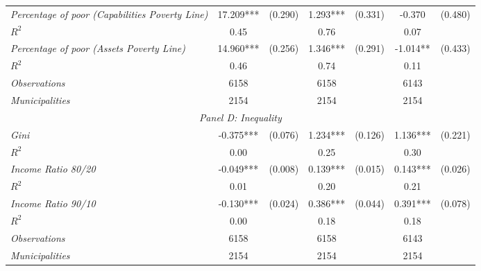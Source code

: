 \begin{tabular}{lcccccc}
\textit{Percentage of poor (Capabilities Poverty Line)}          &  17.209***    & (0.290)      &   1.293***        &  (0.331)      &     -0.370  &    (0.480)   \\
$R^{2}$			           	   &  0.45   & 	   &     0.76   	&		 &     0.07   &  \\

\textit{Percentage of poor (Assets Poverty Line)}          &  14.960***    & (0.256)      &   1.346***        &  (0.291)      &     -1.014**  &    (0.433)   \\
$R^{2}$			           	   &  0.46   & 	   &     0.74   	&		 &     0.11   &  \\


\textit{Observations}                 &   6158    &        & 6158    &  &  6143   &  		\\
\textit{Municipalities}               &   2154   &        & 2154   &  &  2154  &  		\\
\hline		

\multicolumn{7}{c}{\textit{Panel D: Inequality}} \\


\textit{Gini}          &  -0.375***    & (0.076)      &   1.234***        &  (0.126)      &     1.136***  &    (0.221)   \\
$R^{2}$			           	   &  0.00   & 	   &     0.25   	&		 &     0.30   &  \\

\textit{Income Ratio 80/20}          &  -0.049***    & (0.008)      &   0.139***        &  (0.015)      &     0.143***  &    (0.026)   \\
$R^{2}$			           	   &  0.01   & 	   &     0.20   	&		 &     0.21   &  \\
		
\textit{Income Ratio 90/10}          &  -0.130***    & (0.024)      &   0.386***        &  (0.044)      &     0.391***  &    (0.078)   \\
$R^{2}$			           	   &  0.00   & 	   &     0.18   	&		 &     0.18   &  \\


\textit{Observations}                 &   6158    &        & 6158    &  &  6143   &  		\\
\textit{Municipalities}               &   2154   &        & 2154   &  &  2154  &  		\\

\bottomrule
\end{tabular}%
